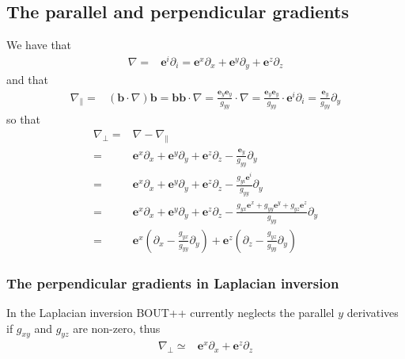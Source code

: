 \documentclass[12pt]{article}
\def\L{\left}
\def\R{\right}
\newcommand{\Grad}{\ensuremath{\nabla}}
\newcommand{\ve}[1]{\ensuremath{\boldsymbol{#1}}}
\begin{document}
\subsection{The parallel and perpendicular gradients}
%
We have that
%
\begin{align*}
    \Grad =& \ve{e}^i \partial_i = \ve{e}^x \partial_x + \ve{e}^y \partial_y +
    \ve{e}^z \partial_z
\end{align*}
%
and that
%
\begin{align*}
    \Grad_\| =& \L(\ve{b} \cdot \Grad\R) \ve{b} = \ve{b} \ve{b} \cdot \Grad =
    \frac{\ve{e}_y \ve{e}_y}{g_{yy}} \cdot \Grad = \frac{\ve{e}_y
    \ve{e}_y}{g_{yy}} \cdot \ve{e}^i \partial_i = \frac{\ve{e}_y}{g_{yy}}
    \partial_y
\end{align*}
%
so that
%
\begin{align*}
    \Grad_\perp =& \Grad - \Grad_\|\\
%
                =& \ve{e}^x \partial_x + \ve{e}^y \partial_y + \ve{e}^z
    \partial_z - \frac{\ve{e}_y}{g_{yy}} \partial_y\\
%
                =& \ve{e}^x \partial_x + \ve{e}^y \partial_y + \ve{e}^z
    \partial_z - \frac{g_{yi}\ve{e}^i}{g_{yy}} \partial_y\\
%
                =& \ve{e}^x \partial_x + \ve{e}^y \partial_y + \ve{e}^z
    \partial_z - \frac{g_{yx}\ve{e}^x +g_{yy}\ve{e}^y +g_{yz}\ve{e}^z
    }{g_{yy}}\partial_y\\
%
                =& \ve{e}^x \L(\partial_x - \frac{g_{yx}}{g_{yy}}\partial_y\R)
    +  \ve{e}^z \L(\partial_z - \frac{g_{yz}}{g_{yy}}\partial_y\R)
\end{align*}
%


\subsubsection{The perpendicular gradients in Laplacian inversion}
%
In the Laplacian inversion BOUT++ currently neglects the parallel $y$
derivatives if $g_{xy}$ and $g_{yz}$ are non-zero, thus
%
\begin{align*}
    \Grad_\perp \simeq& \ve{e}^x \partial_x +  \ve{e}^z \partial_z
\end{align*}
%
\end{document}
